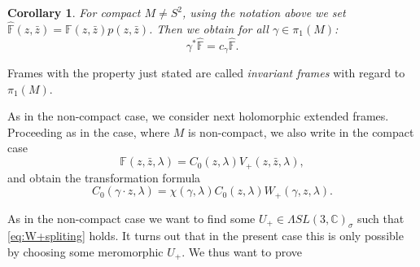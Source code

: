 \documentclass[a4paper,11pt]{amsart}
\newtheorem{corollary}[theorem]{Corollary}
\theoremstyle{definition}
\numberwithin{equation}{section}
\newcommand{\C}{\mathbb{C}}
\newcommand{\F}{\mathbb{F}}
\begin{document}
\begin{corollary} \label{cor5.10}
For compact $M\neq S^2$, using the notation above we set $\hat{\F}(z, \bar{z}) = \F(z, \bar{z}) p(z, \bar{z})$.
Then we obtain for all $\gamma \in \pi_1(M)$:
\begin{equation}
\gamma^* \hat{\F} = c_\gamma  \hat{\F}.
\end{equation}
\end{corollary}

Frames with the property just stated are called
\emph{invariant frames}  with regard to $\pi_1(M)$.

As in the non-compact case, we consider next  holomorphic extended frames.
Proceeding as in the case, where $M$ is non-compact, we also write in the compact case
\begin{equation*}
\F (z,\bar{z},\lambda) = C_0 (z,\lambda)V_+ (z,\bar{z},\lambda),
\end{equation*}
and obtain the transformation formula
\begin{equation}
C_0(\gamma \cdot z,\lambda)=
\chi(\gamma, \lambda) C_0(z,\lambda) W_+(\gamma, z,\lambda). \label{eq:CC}
\end{equation}


As in the non-compact case  we want to find some $U_+ \in 
\Lambda SL(3,\C)_{\sigma}$  such that \eqref{eq:W+spliting} holds.  It turns out that in the present case this is only possible by choosing some meromorphic  $U_+$. 
We thus want to prove
\end{document}
